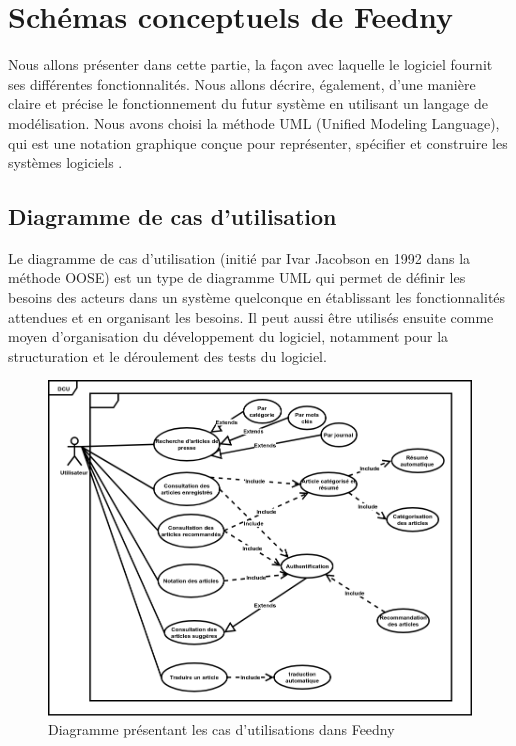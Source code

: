 \section{Schémas conceptuels de \textquotedbl Feedny\textquotedbl }
Nous allons présenter dans cette partie, la façon avec laquelle le logiciel fournit ses différentes fonctionnalités. Nous allons décrire, également, d'une manière claire et précise le fonctionnement du futur système en utilisant un langage de modélisation. Nous avons choisi la méthode UML (Unified Modeling Language), qui est une notation graphique conçue pour représenter, spécifier et construire les systèmes logiciels \cite{UML}.

\subsection{Diagramme de cas d'utilisation}
\textquotedbl Le diagramme de cas d'utilisation (initié par Ivar Jacobson en 1992 dans la méthode OOSE) est un type de diagramme UML qui permet de définir les besoins des acteurs dans un système quelconque en établissant les fonctionnalités attendues et en organisant les besoins. Il peut aussi être utilisés ensuite comme moyen d'organisation du développement du logiciel, notamment pour la structuration et le déroulement des tests du logiciel\textquotedbl\text{ }\cite{UML}.
\begin{figure}[H]
    \centering
    \includegraphics[width=420pt]{img/chapter3/diagcasdutilisation.png}
    \caption{Diagramme présentant les cas d'utilisations dans \textquotedbl Feedny\textquotedbl }
\end{figure}

